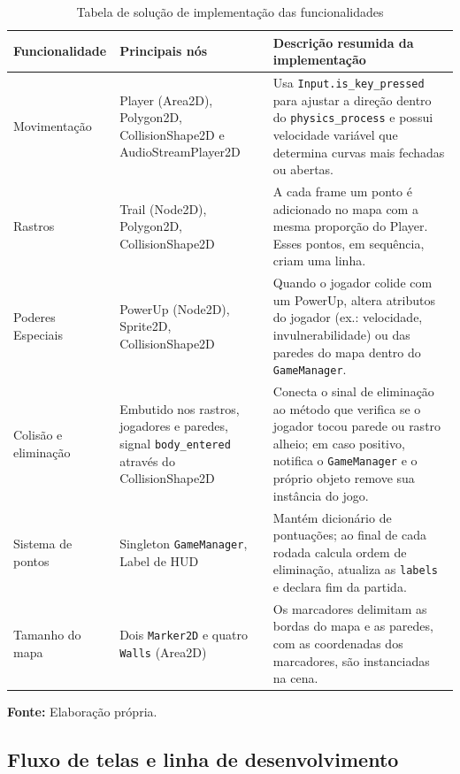\begin{table}[H]
\centering
\caption{Tabela de solução de implementação das funcionalidades}
\label{tab:implementacao-funcionalidades}
\begin{tabular}{|p{3.5cm}|p{4cm}|p{7cm}|}
\hline
\textbf{Funcionalidade} & \textbf{Principais nós} & \textbf{Descrição resumida da implementação} \\
\hline
Movimentação & Player (Area2D), Polygon2D, CollisionShape2D e AudioStreamPlayer2D & Usa \texttt{Input.is\_key\_pressed} para ajustar a direção dentro do \texttt{physics\_process} e possui velocidade variável que determina curvas mais fechadas ou abertas. \\
\hline
Rastros & Trail (Node2D), Polygon2D, CollisionShape2D & A cada frame um ponto é adicionado no mapa com a mesma proporção do Player. Esses pontos, em sequência, criam uma linha. \\
\hline
Poderes Especiais & PowerUp (Node2D), Sprite2D, CollisionShape2D & Quando o jogador colide com um PowerUp, altera atributos do jogador (ex.: velocidade, invulnerabilidade) ou das paredes do mapa dentro do \texttt{GameManager}. \\
\hline
Colisão e eliminação & Embutido nos rastros, jogadores e paredes, signal \texttt{body\_entered} através do CollisionShape2D & Conecta o sinal de eliminação ao método que verifica se o jogador tocou parede ou rastro alheio; em caso positivo, notifica o \texttt{GameManager} e o próprio objeto remove sua instância do jogo. \\
\hline
Sistema de pontos & Singleton \texttt{GameManager}, Label de HUD & Mantém dicionário de pontuações; ao final de cada rodada calcula ordem de eliminação, atualiza as \texttt{labels} e declara fim da partida. \\
\hline
Tamanho do mapa & Dois \texttt{Marker2D} e quatro \texttt{Walls} (Area2D) & Os marcadores delimitam as bordas do mapa e as paredes, com as coordenadas dos marcadores, são instanciadas na cena. \\
\hline
\end{tabular}

\vspace{0.3em}
\small \textbf{Fonte:} Elaboração própria.
\end{table}

\subsection{Fluxo de telas e linha de desenvolvimento}


